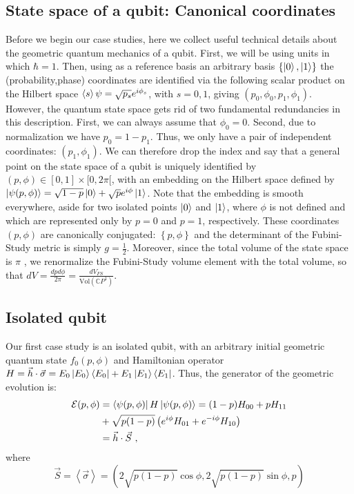 \documentclass[draft,nofootinbib,pre,twocolumn,showpacs,showkeys,preprintnumbers,floatfix]{revtex4-1}
\newcommand{\1}{\mathbbm{1}}
\newcommand{\MV}[1]{\left\langle #1 \right\rangle}
\begin{document}
\subsection*{State space of a qubit: Canonical coordinates}

Before we begin our case studies, here we collect useful technical details
about the geometric quantum mechanics of a qubit. First, we will be using units in
which $\hbar = 1$. Then, using as a reference basis an arbitrary basis $\left\{ \ket{0},\ket{1}\right\}$ 
the (probability,phase) coordinates are identified via the following scalar product 
on the Hilbert space $\braket{s}{\psi} = \sqrt{p_s}e^{i\phi_s}$, with $s=0,1$, giving $(p_0,\phi_0,p_1,\phi_1)$. 
However, the quantum state space gets rid of two fundamental redundancies in this description.
First, we can always assume that $\phi_0 = 0$. Second, due to normalization we have
$p_0 = 1-p_1$. Thus, we only have a pair of independent coordinates: $(p_1,\phi_1)$.
We can therefore drop the index and say that a general point on the state space
of a qubit is uniquely identified by $(p,\phi) \in [0,1]\times[0,2\pi[$, with an embedding on the Hilbert space
defined by $\ket{\psi(p,\phi)} = \sqrt{1-p}\ket{0} + \sqrt{p}e^{i\phi}\ket{1}$. 
Note that the embedding is smooth everywhere, aside for two isolated points $\ket{0}$ and 
$\ket{1}$, where $\phi$ is not defined and which are represented only by $p=0$ and $p=1$, 
respectively. These coordinates $(p,\phi)$ are canonically conjugated: $\left\{ p,\phi\right\}$
and the determinant of the Fubini-Study metric is simply $g= \frac{1}{2}$. Moreover, since the total
volume of the state space is $\pi$ \cite{}, we renormalize the Fubini-Study volume element 
with the total volume, so that $dV = \frac{dpd\phi}{2\pi} = \frac{dV_{FS}}{\mathrm{Vol}(\mathbb{C}P^1)}$.


\subsection*{Isolated qubit}

Our first case study is an isolated qubit, with an arbitrary initial geometric quantum 
state $f_0(p,\phi)$ and Hamiltonian operator $H = \vec{h} \cdot \vec{\sigma} = E_0 \ket{E_0}\bra{E_0} + E_1 \ket{E_1}\bra{E_1}$. 
Thus, the generator of the geometric evolution is:
\begin{align}
\mathcal{E}(p,\phi) & = \bra{\psi(p,\phi)}H\ket{\psi(p,\phi)} = (1-p)H_{00} + p H_{11} \nonumber \\
&+ \sqrt{p(1-p)} \left(e^{i\phi}H_{01}+e^{-i\phi}H_{10} \right) \\
& = \vec{h} \cdot \vec{S} \nonumber~,
\end{align}
where 
\begin{equation}
\vec{S} = \MV{\vec{\sigma}} = \left( 2\sqrt{p(1-p)}\cos \phi, 2\sqrt{p(1-p)}\sin \phi , p\right)
\end{equation}
\end{document}

